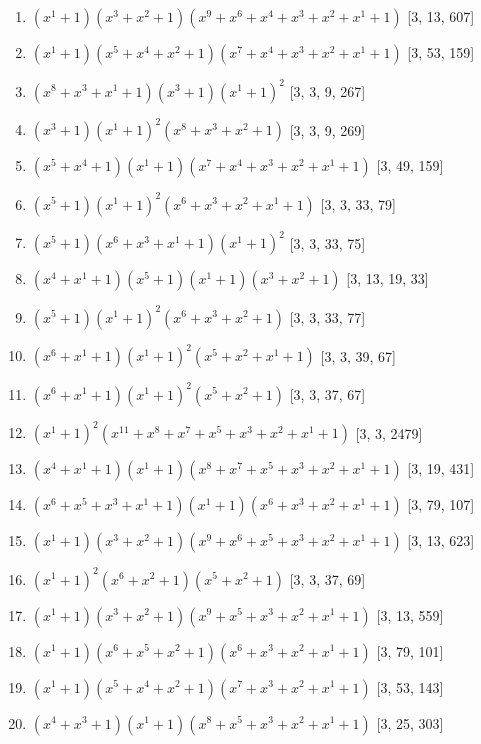 \documentclass[10pt,twocolumn]{article}
\begin{document}
\begin{enumerate}
\item $(x^{1} + 1)(x^{3} + x^{2} + 1)(x^{9} + x^{6} + x^{4} + x^{3} + x^{2} + x^{1} + 1)$  [3, 13, 607]
\item $(x^{1} + 1)(x^{5} + x^{4} + x^{2} + 1)(x^{7} + x^{4} + x^{3} + x^{2} + x^{1} + 1)$  [3, 53, 159]
\item $(x^{8} + x^{3} + x^{1} + 1)(x^{3} + 1)(x^{1} + 1)^{2}$  [3, 3, 9, 267]
\item $(x^{3} + 1)(x^{1} + 1)^{2}(x^{8} + x^{3} + x^{2} + 1)$  [3, 3, 9, 269]
\item $(x^{5} + x^{4} + 1)(x^{1} + 1)(x^{7} + x^{4} + x^{3} + x^{2} + x^{1} + 1)$  [3, 49, 159]
\item $(x^{5} + 1)(x^{1} + 1)^{2}(x^{6} + x^{3} + x^{2} + x^{1} + 1)$  [3, 3, 33, 79]
\item $(x^{5} + 1)(x^{6} + x^{3} + x^{1} + 1)(x^{1} + 1)^{2}$  [3, 3, 33, 75]
\item $(x^{4} + x^{1} + 1)(x^{5} + 1)(x^{1} + 1)(x^{3} + x^{2} + 1)$  [3, 13, 19, 33]
\item $(x^{5} + 1)(x^{1} + 1)^{2}(x^{6} + x^{3} + x^{2} + 1)$  [3, 3, 33, 77]
\item $(x^{6} + x^{1} + 1)(x^{1} + 1)^{2}(x^{5} + x^{2} + x^{1} + 1)$  [3, 3, 39, 67]
\item $(x^{6} + x^{1} + 1)(x^{1} + 1)^{2}(x^{5} + x^{2} + 1)$  [3, 3, 37, 67]
\item $(x^{1} + 1)^{2}(x^{11} + x^{8} + x^{7} + x^{5} + x^{3} + x^{2} + x^{1} + 1)$  [3, 3, 2479]
\item $(x^{4} + x^{1} + 1)(x^{1} + 1)(x^{8} + x^{7} + x^{5} + x^{3} + x^{2} + x^{1} + 1)$  [3, 19, 431]
\item $(x^{6} + x^{5} + x^{3} + x^{1} + 1)(x^{1} + 1)(x^{6} + x^{3} + x^{2} + x^{1} + 1)$  [3, 79, 107]
\item $(x^{1} + 1)(x^{3} + x^{2} + 1)(x^{9} + x^{6} + x^{5} + x^{3} + x^{2} + x^{1} + 1)$  [3, 13, 623]
\item $(x^{1} + 1)^{2}(x^{6} + x^{2} + 1)(x^{5} + x^{2} + 1)$  [3, 3, 37, 69]
\item $(x^{1} + 1)(x^{3} + x^{2} + 1)(x^{9} + x^{5} + x^{3} + x^{2} + x^{1} + 1)$  [3, 13, 559]
\item $(x^{1} + 1)(x^{6} + x^{5} + x^{2} + 1)(x^{6} + x^{3} + x^{2} + x^{1} + 1)$  [3, 79, 101]
\item $(x^{1} + 1)(x^{5} + x^{4} + x^{2} + 1)(x^{7} + x^{3} + x^{2} + x^{1} + 1)$  [3, 53, 143]
\item $(x^{4} + x^{3} + 1)(x^{1} + 1)(x^{8} + x^{5} + x^{3} + x^{2} + x^{1} + 1)$  [3, 25, 303]

\end{enumerate}
\end{document}
